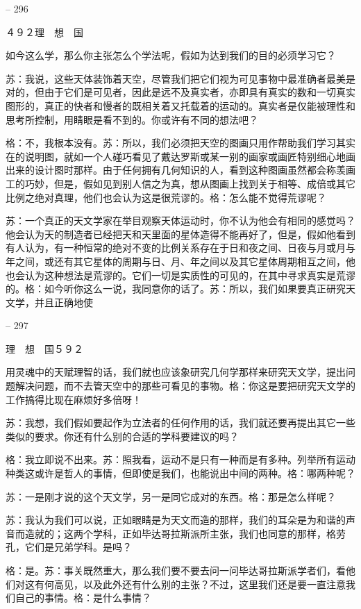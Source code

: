 \documentclass[11pt,oneside]{book}
\begin{document}
\begin{common-format}
    

-- 296

    ４９２理　想　国

    如今这么学，那么你主张怎么个学法呢，假如为达到我们的目的必须学习它？

    苏：我说，这些天体装饰着天空，尽管我们把它们视为可见事物中最准确者最美是对的，但由于它们是可见者，因此是远不及真实者，亦即具有真实的数和一切真实图形的，真正的快者和慢者的既相关着又托载着的运动的。真实者是仅能被理性和思考所控制，用睛眼是看不到的。你或许有不同的想法吧？

    格：不，我根本没有。苏：所以，我们必须把天空的图画只用作帮助我们学习其实在的说明图，就如一个人碰巧看见了戴达罗斯或某一别的画家或画匠特别细心地画出来的设计图时那样。由于任何拥有几何知识的人，看到这种图画虽然都会称羡画工的巧妙，但是，假如见到别人信之为真，想从图画上找到关于相等、成倍或其它比例之绝对真理，他们也会认为这是很荒谬的。格：怎么能不觉得荒谬呢？

    苏：一个真正的天文学家在举目观察天体运动时，你不认为他会有相同的感觉吗？他会认为天的制造者已经把天和天里面的星体造得不能再好了，但是，假如他看到有人认为，有一种恒常的绝对不变的比例关系存在于日和夜之间、日夜与月或月与年之间，或还有其它星体的周期与日、月、年之间以及其它星体周期相互之间，他也会认为这种想法是荒谬的。它们一切是实质性的可见的，在其中寻求真实是荒谬的。格：如今听你这么一说，我同意你的话了。苏：所以，我们如果要真正研究天文学，并且正确地使

    

-- 297

    理　想　国５９２

    用灵魂中的天赋理智的话，我们就也应该象研究几何学那样来研究天文学，提出问题解决问题，而不去管天空中的那些可看见的事物。格：你这是要把研究天文学的工作搞得比现在麻烦好多倍呀！

    苏：我想，我们假如要起作为立法者的任何作用的话，我们就还要再提出其它一些类似的要求。你还有什么别的合适的学科要建议的吗？

    格：我立即说不出来。苏：照我看，运动不是只有一种而是有多种。列举所有运动种类这或许是哲人的事情，但即使是我们，也能说出中间的两种。格：哪两种呢？

    苏：一是刚才说的这个天文学，另一是同它成对的东西。格：那是怎么样呢？

    苏：我认为我们可以说，正如眼睛是为天文而造的那样，我们的耳朵是为和谐的声音而造就的；这两个学科，正如毕达哥拉斯派所主张，我们也同意的那样，格劳孔，它们是兄弟学科。是吗？

    格：是。苏：事关既然重大，那么我们要不要去问一问毕达哥拉斯派学者们，看他们对这有何高见，以及此外还有什么别的主张？不过，这里我们还是要一直注意我们自己的事情。格：是什么事情？


\end{common-format}
\end{document}

